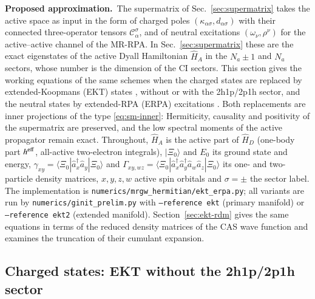\documentclass[aip,jcp,reprint,noshowkeys,superscriptaddress]{revtex4-1}
\newcommand{\Proposed}{\textbf{Proposed approximation.}\ }
\begin{document}
\Proposed The supermatrix of Sec.~\ref{sec:supermatrix} takes the active
space as input in the form of charged poles $(\kappa_{\alpha\sigma},d_{\alpha\sigma})$
with their connected three-operator tensors $\mathcal C^{\sigma}_{\alpha}$,
and of neutral excitations $(\omega_\nu,\rho^{\nu})$ for the active--active
channel of the MR-RPA.  In Sec.~\ref{sec:supermatrix} these are the exact
eigenstates of the active Dyall Hamiltonian $\hat H_A$ in the $N_a\pm1$ and
$N_a$ sectors, whose number is the dimension of the CI sectors.  This
section gives the working equations of the same schemes when the charged
states are replaced by extended-Koopmans (EKT) states
\cite{DaySmithGarrod1974,MorrellParrLevy1975}, without or with the
2h1p/2p1h sector, and the neutral states by extended-RPA (ERPA)
excitations \cite{ChatterjeePernal2012}.  Both replacements are inner
projections of the type \eqref{eq:sm-inner}: Hermiticity, causality and
positivity of the supermatrix are preserved, and the low spectral moments
of the active propagator remain exact.  Throughout, $\hat H_A$ is the
active part of $\hat H_D$ (one-body part $h^{\rm eff}$, all-active
two-electron integrals), $|\Xi_0\rangle$ and $E_0$ its ground state and
energy, $\gamma_{xy}=\langle\Xi_0|\hat a_x^\dagger\hat a_y|\Xi_0\rangle$
and $\Gamma_{xy,wz}=\langle\Xi_0|\hat a_x^\dagger\hat a_y^\dagger\hat a_w\hat a_z|\Xi_0\rangle$
its one- and two-particle density matrices, $x,y,z,w$ active spin
orbitals and $\sigma=\pm$ the sector label.  The implementation is
\texttt{numerics/mrgw\_hermitian/ekt\_erpa.py}; all variants are run by
\texttt{numerics/ginit\_prelim.py} with \texttt{--reference ekt}
(primary manifold) or \texttt{--reference ekt2} (extended manifold).
Section~\ref{sec:ekt-rdm} gives the same equations in terms of the reduced
density matrices of the CAS wave function and examines the truncation of
their cumulant expansion.

\subsection{Charged states: EKT without the 2h1p/2p1h sector}
\label{sec:ekt-primary}
\end{document}
